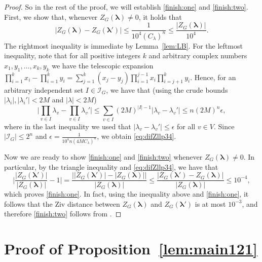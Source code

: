 \documentclass[11pt]{article}
\def\lambdab{\ensuremath{\boldsymbol{\lambda}}}
\begin{document}
\begin{proof}
So in the rest of the proof, we will establish \eqref{finish:one} and \eqref{finish:two}. First, we show that, whenever $Z_G(\lambdab)\neq 0$, it holds that
\begin{equation}\label{eq:difZllp34}
|Z_G(\lambdab) - Z_G(\lambdab')|\leq \frac{1}{10^4(C_\lambda)^n}\leq \frac{|Z_G(\lambdab)|}{10^4}.
\end{equation}
The rightmost inequality is immediate by Lemma~\ref{lem:LB}. For the leftmost inequality, note that for all positive integers $k$ and arbitrary complex numbers $x_1,y_1,\hdots,x_k,y_k$ we have the telescopic expansion $\prod^{k}_{i=1}x_i-\prod^{k}_{i=1}y_i=\sum^{k}_{j=1}(x_{j}-y_{j})\prod^{j-1}_{i=1}x_i\prod^{k}_{i=j+1}y_i$. Hence, for an arbitrary independent set $I\in \mathcal{I}_G$,  we have that (using  the crude bounds $|\lambda_i|,|\lambda_i'|<2M$ and $|\lambda|<2M$)
\[\Big|\prod_{v\in I}\lambda_v-\prod_{v\in I}\lambda_v'\Big|\leq \sum_{v\in I}(2M)^{|I|-1}|\lambda_v-\lambda_v'|\leq n (2M)^{n} \epsilon,\]
where in the last inequality we used that $|\lambda_v-\lambda_v'|\leq \epsilon$ for all $v\in V$. Since $|\mathcal{I}_G|\leq 2^n$ and $\epsilon=\frac{1}{10^{4}n(4M C_\lambda)^{n}}$, we obtain \eqref{eq:difZllp34}.


Now we are ready to show \eqref{finish:one} and \eqref{finish:two} whenever $Z_G(\lambdab)\neq 0$.
In particular, by the triangle inequality and \eqref{eq:difZllp34}, we have that
\[
\bigg|\frac{|Z_G(\lambdab')|}
{|Z_G(\lambdab)|} -1\bigg|=\frac{\big||Z_G(\lambdab')|-|Z_G(\lambdab)|\big|}
{|Z_G(\lambdab)|}\leq \frac{|Z_G(\lambdab')-Z_G(\lambdab)|}{|Z_G(\lambdab)|}\leq 10^{-4},
\]
which proves \eqref{finish:one}. In fact, using the inequality above and \eqref{finish:one}, it follows that the Ziv distance between $Z_G(\lambdab)$ and $Z_G(\lambdab')$ is at most $10^{-3}$, and therefore \eqref{finish:two} follows from  \cite[Lemma 2.1]{ComplexIsing}. \end{proof}







\section{Proof of  Proposition~\ref{lem:main121}}\label{sec:mainpart}
\end{document}
